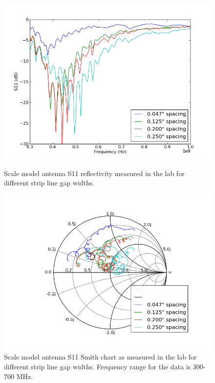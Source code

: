 \begin{figure}[htb]
\centering
\begin{minipage}[b]{0.50\textwidth}
\centering
\includegraphics[width=0.95\linewidth]{SCIHI_system/figures/HIbiscus_S11_model_spacing_dB.png}
\caption{Scale model antenna S11 reflectivity measured in the lab for different strip line gap widths. }
\label{Fig:HIS11_model_inc_dB}
\end{minipage}%
\begin{minipage}[b]{0.02\textwidth}
\hspace{1cm}
\end{minipage}%
\begin{minipage}[b]{0.46\textwidth}
\centering
\includegraphics[width=0.95\linewidth]{SCIHI_system/figures/HIbiscus_S11_model_spacing_Smith.png}
\caption{Scale model antenna S11 Smith chart as measured in the lab for different strip line gap widths. Frequency range for the data is 300-700 MHz. }
\label{Fig:HIS11_model_inc_Smith}
\end{minipage}
\end{figure}

